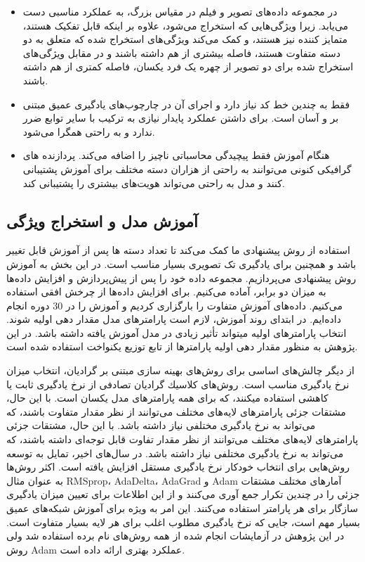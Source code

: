 \begin{itemize}
 \item
در مجموعه داده‌های تصویر و فیلم در مقیاس بزرگ‌، به عملکرد مناسبی دست می‌یابد. زیرا ویژگی‌هایی که استخراج ‌می‌شود، علاوه بر اینکه قابل تفکیک  هستند، متمایز کننده  نیز هستند، و کمک می‌کند ویژگی‌های استخراج شده که متعلق به دو دسته متفاوت هستند، فاصله بیشتری از هم داشته باشند و در مقابل ویژگی‌های استخراج شده برای دو تصویر از چهره یک فرد یکسان، فاصله کمتری از هم داشته باشند.
 \item
فقط به چندین خط کد نیاز دارد و اجرای آن در چارچوب‌های  یادگیری عمیق مبتنی بر  و  آسان است. برای داشتن عملکرد پایدار نیازی به ترکیب با سایر توابع ضرر ندارد و به راحتی همگرا می‌شود.
 \item
هنگام آموزش فقط پیچیدگی محاسباتی ناچیز را اضافه می‌کند. پردازنده های گرافیکی کنونی می‌توانند به راحتی از هزاران دسته مختلف برای آموزش پشتیبانی کنند و مدل به راحتی می‌تواند هویت‌های بیشتری را پشتیبانی کند.
\end{itemize} 

\subsection{آموزش مدل و استخراج ویژگی}
استفاده از روش پیشنهادی ما کمک می‌کند تا تعداد دسته ها پس از آموزش قابل تغییر باشد و همچنین برای یادگیری تک تصویری  بسیار مناسب است. در این بخش به آموزش روش پیشنهادی می‌پردازیم. مجموعه داده خود را پس از پیش‌پردازش و افزایش‌ داده‌ها  به میزان دو برابر، آماده می‌کنیم. برای افزایش داده‌ها از چرخش افقی  استفاده می‌کنیم. داده‌های آموزش متفاوت را بارگزاری کردیم و آموزش را در 30 دوره  انجام داده‌ایم. در ابتدای روند آموزش، لازم است پارامترهای مدل مقدار دهی اولیه شوند. انتخاب پارامترهای اولیه میتواند تأثیر زیادی در مدل آموزش یافته داشته باشد. در این پژوهش به منظور مقدار دهی اولیه پارامترها از تابع توزیع یكنواخت استفاده شده است. 

\noindent
از دیگر چالش‌های اساسی برای روش‌های بهینه سازی مبتنی بر گرادیان، انتخاب میزان نرخ یادگیری مناسب است. روش‌های كلاسیك گرادیان تصادفی از نرخ یادگیری ثابت یا كاهشی استفاده میكنند، كه برای همه پارامترهای مدل یكسان است. با این حال، مشتقات جزئی پارامترهای لایه‌های مختلف می‌توانند از نظر مقدار متفاوت باشند، كه می‌تواند به نرخ یادگیری مختلفی نیاز داشته باشد. با این حال، مشتقات جزئی پارامترهای لایه‌های مختلف می‌توانند از نظر مقدار تفاوت قابل توجه‌ای داشته باشند، كه می‌تواند به نرخ یادگیری مختلفی نیاز داشته باشد. در سال‌های اخیر، تمایل به توسعه روش‌هایی برای انتخاب خودكار نرخ یادگیری مستقل افزایش یافته است. اكثر روش‌ها به عنوان مثال
RMSprop، 
AdaDelta، 
AdaGrad
و Adam آمارهای مختلف مشتقات جزئی را در چندین تكرار جمع آوری می‌كنند و از این اطلاعات برای تعیین میزان یادگیری سازگار برای هر پارامتر استفاده می‌كنند. این امر به ویژه برای آموزش شبكه‌های عمیق بسیار مهم است، جایی كه نرخ یادگیری مطلوب اغلب برای هر لایه بسیار متفاوت است. در این پژوهش در آزمایشات انجام شده از همه روش‌های نام برده استفاده شد ولی روش Adam عملكرد بهتری ارائه داده است.

